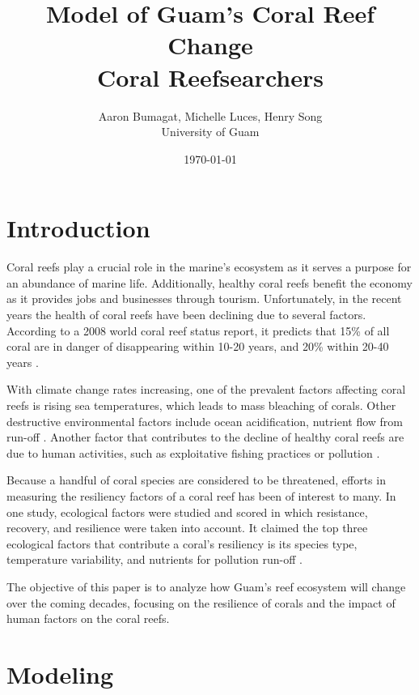 \documentclass[12pt]{article}
\title{Model of Guam's Coral Reef Change\\Coral Reefsearchers}
\author{Aaron Bumagat, Michelle Luces, Henry Song\\University of Guam}
\date{\today}
\begin{document}
\maketitle

\section{Introduction}
Coral reefs play a crucial role in the marine's ecosystem as it serves a purpose for an abundance of marine life. Additionally, healthy coral reefs benefit the economy as it provides jobs and businesses through tourism. Unfortunately, in the recent years the health of coral reefs have been declining due to several factors. According to a 2008 world coral reef status report, it predicts that 15\% of all coral are in danger of disappearing within 10-20 years, and 20\% within 20-40 years \cite{quintero_machuca_cotto_bradley_ríos-soto_2016}. 

With climate change rates increasing, one of the prevalent factors affecting coral reefs is rising sea temperatures, which leads to mass bleaching of corals. Other destructive environmental factors include ocean acidification, nutrient flow from run-off \cite{quintero_machuca_cotto_bradley_ríos-soto_2016}. Another factor that contributes to the decline of healthy coral reefs are due to human activities, such as exploitative fishing practices or pollution \cite{mathanalysis}. 

Because a handful of coral species are considered to be threatened, efforts in measuring the resiliency factors of a coral reef has been of interest to many. In one study, ecological factors were studied and scored in which resistance, recovery, and resilience were taken into account. It claimed the top three ecological factors that contribute a coral's resiliency is its species type, temperature variability, and nutrients for pollution run-off \cite{Riegl_Purkis_Model}. 

The objective of this paper is to analyze how Guam's reef ecosystem will change over the coming decades, focusing on the resilience of corals and the impact of human factors on the coral reefs. 



\section{Modeling}
\end{document}
